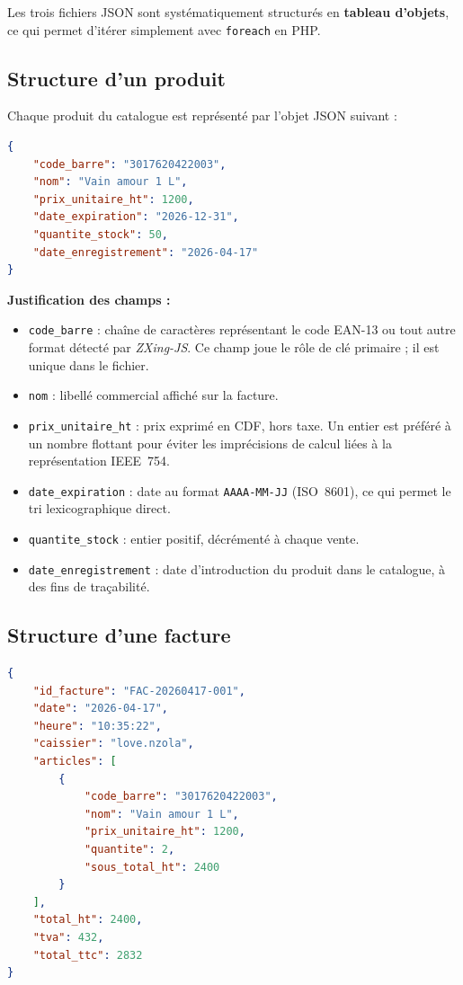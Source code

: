 \documentclass[12pt,a4paper]{article}
\begin{document}
Les trois fichiers JSON sont systématiquement structurés en \textbf{tableau d'objets}, ce qui permet d'itérer simplement avec \texttt{foreach} en PHP.

\subsection{Structure d'un produit}

Chaque produit du catalogue est représenté par l'objet JSON suivant :

\begin{lstlisting}[language=json, caption={Exemple d'enregistrement d'un produit}]
{
    "code_barre": "3017620422003",
    "nom": "Vain amour 1 L",
    "prix_unitaire_ht": 1200,
    "date_expiration": "2026-12-31",
    "quantite_stock": 50,
    "date_enregistrement": "2026-04-17"
}
\end{lstlisting}

\textbf{Justification des champs :}
\begin{itemize}[leftmargin=1.5em]
    \item \texttt{code\_barre} : chaîne de caractères représentant le code EAN-13 ou tout autre format détecté par \textit{ZXing-JS}. Ce champ joue le rôle de clé primaire ; il est unique dans le fichier.
    \item \texttt{nom} : libellé commercial affiché sur la facture.
    \item \texttt{prix\_unitaire\_ht} : prix exprimé en CDF, hors taxe. Un entier est préféré à un nombre flottant pour éviter les imprécisions de calcul liées à la représentation IEEE~754.
    \item \texttt{date\_expiration} : date au format \texttt{AAAA-MM-JJ} (ISO~8601), ce qui permet le tri lexicographique direct.
    \item \texttt{quantite\_stock} : entier positif, décrémenté à chaque vente.
    \item \texttt{date\_enregistrement} : date d'introduction du produit dans le catalogue, à des fins de traçabilité.
\end{itemize}

\subsection{Structure d'une facture}

\begin{lstlisting}[language=json, caption={Exemple de facture}]
{
    "id_facture": "FAC-20260417-001",
    "date": "2026-04-17",
    "heure": "10:35:22",
    "caissier": "love.nzola",
    "articles": [
        {
            "code_barre": "3017620422003",
            "nom": "Vain amour 1 L",
            "prix_unitaire_ht": 1200,
            "quantite": 2,
            "sous_total_ht": 2400
        }
    ],
    "total_ht": 2400,
    "tva": 432,
    "total_ttc": 2832
}
\end{lstlisting}
\end{document}
